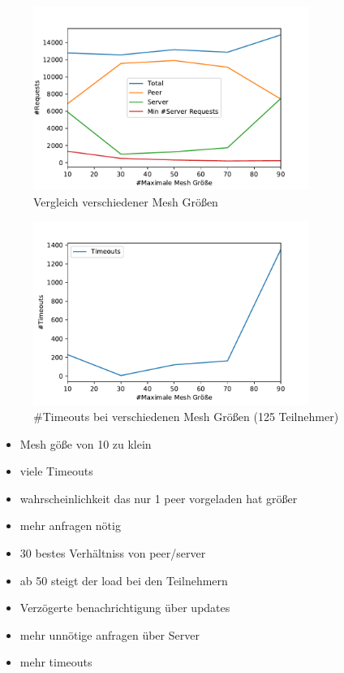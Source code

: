 \begin{figure}[!h]
	\centering
	\includegraphics[width=0.8\textwidth]{figures/mesh_comparison}
	\caption[A Figure Short-Title]{Vergleich verschiedener Mesh Größen}
	\label{fig:mesh_comparison}
\end{figure}



\begin{figure}[!h]
	\centering
	\includegraphics[width=0.8\textwidth]{figures/timeouts_meshed}
	\caption[A Figure Short-Title]{#Timeouts bei verschiedenen Mesh Größen (125 Teilnehmer)}
	\label{fig:timeouts_meshed}
\end{figure}

\begin{itemize}
	\item Mesh göße von 10 zu klein 
	\item viele Timeouts
	\item wahrscheinlichkeit das nur 1 peer vorgeladen hat größer
	\item mehr anfragen nötig
	\item 30 bestes Verhältniss von peer/server
	\item ab 50 steigt der load bei den Teilnehmern
	\item Verzögerte benachrichtigung über updates
	\item mehr unnötige anfragen über Server
	\item mehr timeouts
\end{itemize}

